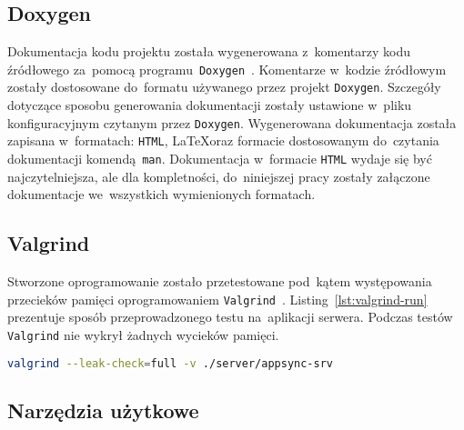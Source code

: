 \documentclass[thesis]{subfiles}
\begin{document}

\subsection{Doxygen}

Dokumentacja kodu projektu została wygenerowana z~komentarzy kodu źródłowego za~pomocą programu~\texttt{Doxygen}~\cite{doxygen}. Komentarze w~kodzie źródłowym zostały dostosowane do~formatu używanego przez projekt \texttt{Doxygen}. Szczegóły dotyczące sposobu generowania dokumentacji zostały ustawione w~pliku konfiguracyjnym  czytanym przez \texttt{Doxygen}. Wygenerowana dokumentacja została zapisana w~formatach: \texttt{HTML}, \LaTeX oraz formacie dostosowanym do~czytania dokumentacji komendą~\texttt{man}. Dokumentacja w~formacie \texttt{HTML} wydaje się być najczytelniejsza, ale dla kompletności, do~niniejszej pracy zostały załączone dokumentacje we~wszystkich wymienionych formatach.


\subsection{Valgrind}

Stworzone oprogramowanie zostało przetestowane pod~kątem występowania przecieków pamięci oprogramowaniem \texttt{Valgrind}~\cite{valgrind}. Listing~\ref{lst:valgrind-run} prezentuje sposób przeprowadzonego testu na~aplikacji serwera. Podczas testów \texttt{Valgrind} nie wykrył żadnych wycieków pamięci.

\begin{lstlisting}[label=lst:valgrind-run,language=bash,numbers=none,caption={Uruchomienie \texttt{Valgrind} w~trybie wykrywania wszystkich dostępnych testów wycieków pamięci na~aplikacji serwera }]
valgrind --leak-check=full -v ./server/appsync-srv
\end{lstlisting}

%
%


\subsection{Narzędzia użytkowe}
\end{document}
